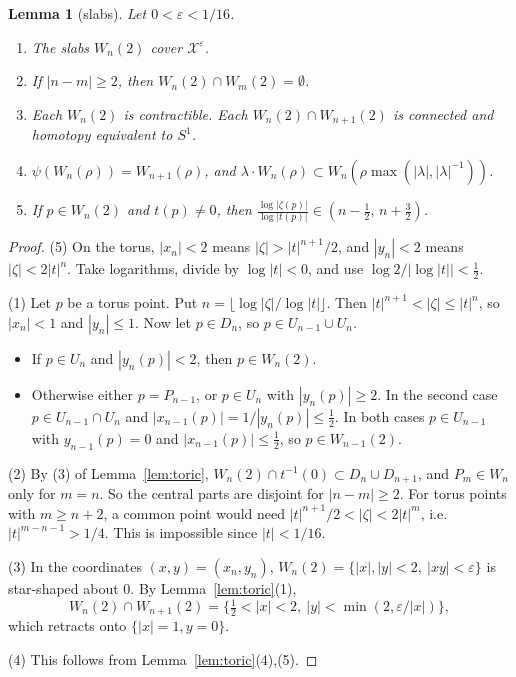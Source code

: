 \documentclass{article}
\newtheorem{lemma}[theorem]{Lemma}
\theoremstyle{definition}
\theoremstyle{plain}
\newcommand{\cX}{\mathcal{X}}
\begin{document}
\begin{lemma}[slabs]\label{lem:slabs}
Let $0<\varepsilon<1/16$.
\begin{enumerate}
\item The slabs $W_n(2)$ cover $\cX^\varepsilon$.
\item If $|n-m|\ge2$, then $W_n(2)\cap W_m(2)=\emptyset$.
\item Each $W_n(2)$ is contractible. Each $W_n(2)\cap W_{n+1}(2)$ is connected and
  homotopy equivalent to $S^1$.
\item $\psi(W_n(\rho))=W_{n+1}(\rho)$, and $\lambda\cdot W_n(\rho)\subset W_n(\rho\max(|\lambda|,|\lambda|^{-1}))$.
\item If $p\in W_n(2)$ and $t(p)\neq0$, then
  $\frac{\log|\zeta(p)|}{\log|t(p)|}\in(n-\tfrac12,\,n+\tfrac32)$.
\end{enumerate}
\end{lemma}
\begin{proof}
(5) On the torus, $|x_n|<2$ means $|\zeta|>|t|^{n+1}/2$, and $|y_n|<2$ means
$|\zeta|<2|t|^n$. Take logarithms, divide by $\log|t|<0$, and use
$\log2/|\log|t||<\tfrac12$.

(1) Let $p$ be a torus point. Put $n=\lfloor\log|\zeta|/\log|t|\rfloor$. Then
$|t|^{n+1}<|\zeta|\le|t|^n$, so $|x_n|<1$ and $|y_n|\le1$.
Now let $p\in D_n$, so $p\in U_{n-1}\cup U_n$.
\begin{itemize}
\item If $p\in U_n$ and $|y_n(p)|<2$, then $p\in W_n(2)$.
\item Otherwise either $p=P_{n-1}$, or $p\in U_n$ with $|y_n(p)|\ge2$. In the second
  case $p\in U_{n-1}\cap U_n$ and $|x_{n-1}(p)|=1/|y_n(p)|\le\tfrac12$. In both cases
  $p\in U_{n-1}$ with $y_{n-1}(p)=0$ and $|x_{n-1}(p)|\le\tfrac12$, so $p\in W_{n-1}(2)$.
\end{itemize}

(2) By (3) of Lemma~\ref{lem:toric}, $W_n(2)\cap t^{-1}(0)\subset D_n\cup D_{n+1}$, and
$P_m\in W_n$ only for $m=n$. So the central parts are disjoint for $|n-m|\ge2$.
For torus points with $m\ge n+2$, a common point would need
$|t|^{n+1}/2<|\zeta|<2|t|^m$, i.e.\ $|t|^{m-n-1}>1/4$. This is impossible since
$|t|<1/16$.

(3) In the coordinates $(x,y)=(x_n,y_n)$, $W_n(2)=\{|x|,|y|<2,\ |xy|<\varepsilon\}$ is
star-shaped about $0$. By Lemma~\ref{lem:toric}(1),
\[W_n(2)\cap W_{n+1}(2)=\{\tfrac12<|x|<2,\ |y|<\min(2,\varepsilon/|x|)\},\]
which retracts onto $\{|x|=1,y=0\}$.

(4) This follows from Lemma~\ref{lem:toric}(4),(5).
\end{proof}
\end{document}
